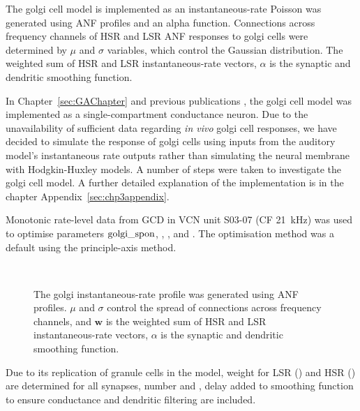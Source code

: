 The golgi cell model is implemented as an instantaneous-rate Poisson
was generated using ANF profiles and an alpha function. Connections
across frequency channels of HSR and LSR ANF responses to golgi cells
were determined by $\mu$ and $\sigma$ variables, which control the
Gaussian distribution. The weighted sum of HSR and LSR
instantaneous-rate vectors, $\alpha$ is the synaptic and dendritic
smoothing function.  \medskip{}

In Chapter~\ref{sec:GAChapter} and previous publications
\citep{EagerGraydenEtAl:2006a}, the golgi cell model was implemented
as a single-compartment conductance neuron. Due to the unavailability
of sufficient data regarding \emph{in vivo} golgi cell responses, we
have decided to simulate the response of golgi cells using inputs from
the auditory model's instantaneous rate outputs rather than simulating
the neural membrane with Hodgkin-Huxley models.  A number of steps
were taken to investigate the golgi cell model. A further detailed
explanation of the implementation is in the chapter
Appendix~\ref{sec:chp3appendix}.

\medskip{}

Monotonic rate-level data from GCD in VCN \citep{GhoshalKim:1996} unit
S03-07 (CF 21~kHz) was used to optimise parameters ${\rm
golgi\_spon}$, \wLSRGLG, \wHSRGLG, and \sANFGLG\@.  The optimisation
method was a default using the principle-axis method.

 \begin{figure}[h!]
   \centering
  \\
  
   \caption{The golgi instantaneous-rate profile was generated using ANF
     profiles. $\mu$ and $\sigma$ control the spread of connections
     across frequency channels, and $\mathbf{w}$ is
     the weighted sum of HSR and LSR instantaneous-rate vectors,
     $\alpha$ is the synaptic and dendritic smoothing function.}\label{fig:GolgiDiagram}
 \end{figure}

\medskip{}

Due to its replication of granule cells in the model, weight for LSR
(\wLSRGLG) and HSR (\wHSRGLG) are determined for all synapses, number
\nLSRDS and \nHSRDS, delay \dANFGLG added to smoothing function to
ensure conductance and dendritic filtering are included.

